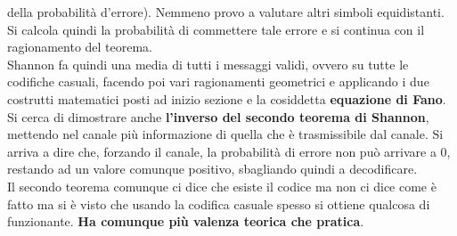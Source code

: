 \documentclass[a4paper,12pt, oneside]{book}
\begin{document}
della probabilità d'errore). Nemmeno provo a valutare altri simboli
equidistanti. Si calcola quindi la probabilità di commettere tale errore e si
continua con il ragionamento del teorema.\\
Shannon fa quindi una media di tutti i messaggi validi, ovvero su tutte le
codifiche casuali, facendo poi vari ragionamenti geometrici e applicando i due
costrutti matematici posti ad inizio sezione e la cosiddetta
\textbf{equazione di Fano}.\\
Si cerca di dimostrare anche \textbf{l'inverso del secondo teorema di Shannon},
mettendo nel canale più informazione di quella che è trasmissibile dal
canale. Si arriva a dire che, forzando il canale, la probabilità di errore non
può arrivare a 0, restando ad un valore comunque positivo, sbagliando quindi a
decodificare.\\ 
Il secondo teorema comunque ci dice che esiste il codice ma non ci dice come è
fatto ma si è 
visto che usando la codifica casuale spesso si ottiene qualcosa di
funzionante. \textbf{Ha comunque più valenza teorica che pratica}.
\end{document}
